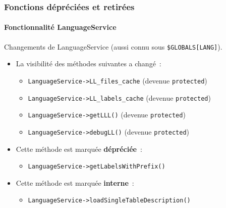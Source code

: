 \begin{frame}[fragile]
	\frametitle{Fonctions dépréciées et retirées}
	\framesubtitle{Fonctionnalité LanguageService}

	Changements de LanguageService (aussi connu sous \texttt{\$GLOBALS[LANG]}).
	\vspace{0.4cm}
	\begin{itemize}
		\item La visibilité des méthodes suivantes a changé~:
			\begin{itemize}\smaller
				\item \texttt{LanguageService->LL\_files\_cache} (devenue \texttt{protected})
				\item \texttt{LanguageService->LL\_labels\_cache} (devenue \texttt{protected})
				\item \texttt{LanguageService->getLLL()} (devenue \texttt{protected})
				\item \texttt{LanguageService->debugLL()} (devenue \texttt{protected})
			\end{itemize}\normalsize
			\vspace{0.2cm}

		\item Cette méthode est marquée \textbf{dépréciée}~:
			\begin{itemize}\smaller
				\item \texttt{LanguageService->getLabelsWithPrefix()}
			\end{itemize}\normalsize
			\vspace{0.2cm}

		\item Cette méthode est marquée \textbf{interne}~:
			\begin{itemize}\smaller
				\item \texttt{LanguageService->loadSingleTableDescription()}
			\end{itemize}\normalsize
			\vspace{0.2cm}

	\end{itemize}

\end{frame}



